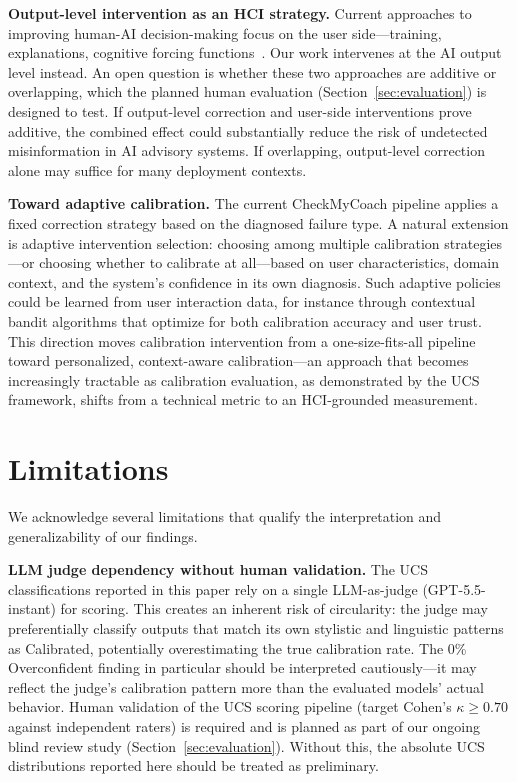 \documentclass[manuscript, review, anonymous]{acmart}
\begin{document}
\textbf{Output-level intervention as an HCI strategy.} Current approaches to improving human-AI decision-making focus on the user side---training, explanations, cognitive forcing functions~\cite{bucinca2021trust}. Our work intervenes at the AI output level instead. An open question is whether these two approaches are additive or overlapping, which the planned human evaluation (Section~\ref{sec:evaluation}) is designed to test. If output-level correction and user-side interventions prove additive, the combined effect could substantially reduce the risk of undetected misinformation in AI advisory systems. If overlapping, output-level correction alone may suffice for many deployment contexts.

\textbf{Toward adaptive calibration.} The current CheckMyCoach pipeline applies a fixed correction strategy based on the diagnosed failure type. A natural extension is adaptive intervention selection: choosing among multiple calibration strategies---or choosing whether to calibrate at all---based on user characteristics, domain context, and the system's confidence in its own diagnosis. Such adaptive policies could be learned from user interaction data, for instance through contextual bandit algorithms that optimize for both calibration accuracy and user trust. This direction moves calibration intervention from a one-size-fits-all pipeline toward personalized, context-aware calibration---an approach that becomes increasingly tractable as calibration evaluation, as demonstrated by the UCS framework, shifts from a technical metric to an HCI-grounded measurement.

\section{Limitations}
\label{sec:limitations}

We acknowledge several limitations that qualify the interpretation and generalizability of our findings.

\textbf{LLM judge dependency without human validation.} The UCS classifications reported in this paper rely on a single LLM-as-judge (GPT-5.5-instant) for scoring. This creates an inherent risk of circularity: the judge may preferentially classify outputs that match its own stylistic and linguistic patterns as Calibrated, potentially overestimating the true calibration rate. The 0\% Overconfident finding in particular should be interpreted cautiously---it may reflect the judge's calibration pattern more than the evaluated models' actual behavior. Human validation of the UCS scoring pipeline (target Cohen's $\kappa \geq 0.70$ against independent raters) is required and is planned as part of our ongoing blind review study (Section~\ref{sec:evaluation}). Without this, the absolute UCS distributions reported here should be treated as preliminary.
\end{document}
